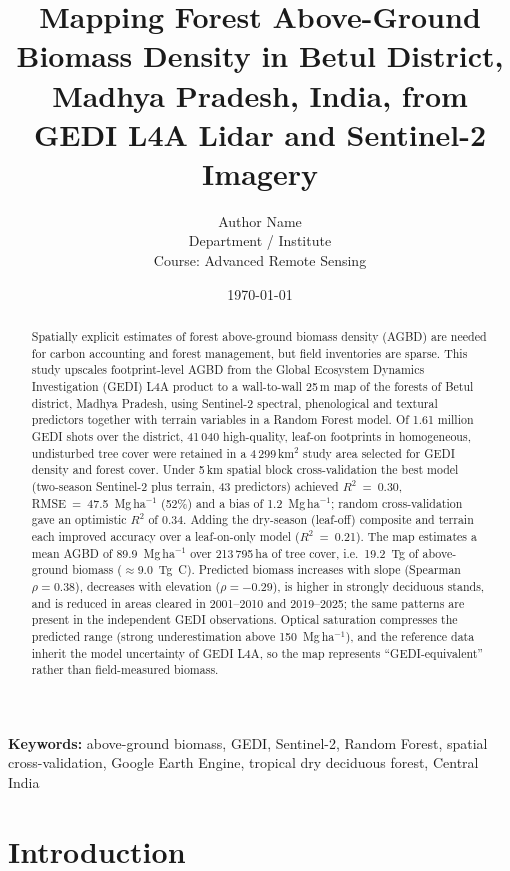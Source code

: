 \documentclass[11pt,a4paper]{article}
\title{Mapping Forest Above-Ground Biomass Density in Betul District,
Madhya Pradesh, India, from GEDI L4A Lidar and Sentinel-2 Imagery}
\author{Author Name\\[2pt]
\small Department / Institute\\
\small Course: Advanced Remote Sensing}
\date{\today}
\newcommand{\mgha}{Mg\,ha$^{-1}$}
\newcommand{\rsq}{$R^2$}
\begin{document}
\maketitle

\begin{abstract}
Spatially explicit estimates of forest above-ground biomass density (AGBD) are needed for
carbon accounting and forest management, but field inventories are sparse. This study
upscales footprint-level AGBD from the Global Ecosystem Dynamics Investigation (GEDI) L4A
product to a wall-to-wall 25\,m map of the forests of Betul district, Madhya Pradesh, using
Sentinel-2 spectral, phenological and textural predictors together with terrain variables in a
Random Forest model. Of 1.61 million GEDI shots over the district, 41\,040 high-quality,
leaf-on footprints in homogeneous, undisturbed tree cover were retained in a 4\,299\,km$^2$
study area selected for GEDI density and forest cover. Under 5\,km spatial block
cross-validation the best model (two-season Sentinel-2 plus terrain, 43 predictors) achieved
\rsq{}~=~0.30, RMSE~=~47.5~\mgha{} (52\%) and a bias of 1.2~\mgha{}; random cross-validation
gave an optimistic \rsq{} of 0.34. Adding the dry-season (leaf-off) composite and terrain each
improved accuracy over a leaf-on-only model (\rsq{}~=~0.21). The map estimates a mean AGBD of
89.9~\mgha{} over 213\,795\,ha of tree cover, i.e.\ 19.2~Tg of above-ground biomass
($\approx$9.0~Tg~C). Predicted biomass increases with slope (Spearman $\rho=0.38$), decreases
with elevation ($\rho=-0.29$), is higher in strongly deciduous stands, and is reduced in areas
cleared in 2001--2010 and 2019--2025; the same patterns are present in the independent GEDI
observations. Optical saturation compresses the predicted range (strong underestimation above
150~\mgha{}), and the reference data inherit the model uncertainty of GEDI L4A, so the map
represents ``GEDI-equivalent'' rather than field-measured biomass.
\end{abstract}

\noindent\textbf{Keywords:} above-ground biomass, GEDI, Sentinel-2, Random Forest, spatial
cross-validation, Google Earth Engine, tropical dry deciduous forest, Central India

\section{Introduction}
\end{document}

